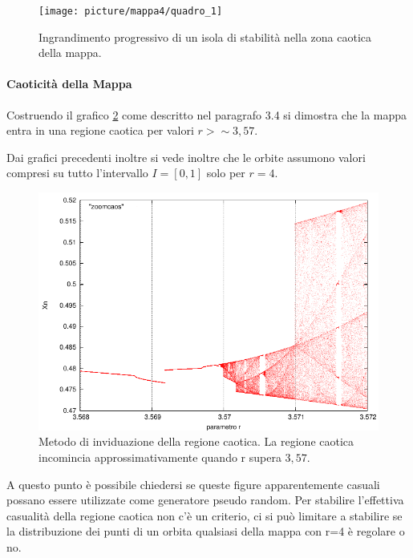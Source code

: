 \documentclass[13pt]{article}
\begin{document}
\begin{figure}
\centering
\texttt{[image: picture/mappa4/quadro\_1]}
\caption{Ingrandimento progressivo di un isola di stabilità nella zona caotica della mappa.}
\label{fig:isole}
\end{figure}




\clearpage
\paragraph{Caoticità della Mappa}

Costruendo il grafico \ref{fig:identicaos} come descritto nel paragrafo 3.4 si dimostra che la mappa entra in una regione caotica per valori $r > \sim 3,57 $.

Dai grafici precedenti inoltre si vede inoltre che le orbite assumono valori compresi su tutto l'intervallo $ I=[0,1]$ solo per $r = 4$.


\begin{figure}[!h]
\centering
\includegraphics[width=14cm,keepaspectratio]{picture/mappa7/zoomcaos}
\caption{Metodo di inviduazione della regione caotica. La regione caotica incomincia approssimativamente quando r supera $3,57$.}
\label{fig:identicaos}
\end{figure}

A questo punto è possibile chiedersi se queste figure apparentemente casuali possano essere utilizzate come generatore pseudo random.
Per stabilire l'effettiva casualità della regione caotica non c'è un criterio, ci si può limitare a stabilire se la distribuzione dei punti di un orbita qualsiasi della mappa con r=4 è regolare o no.
\end{document}
